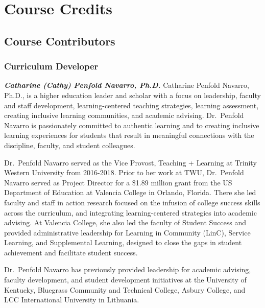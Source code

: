 \documentclass[
]{book}
\begin{document}
\hypertarget{course-credits}{%
\chapter*{Course Credits}\label{course-credits}}

\hypertarget{course-contributors}{%
\section*{Course Contributors}\label{course-contributors}}

\hypertarget{curriculum-developer}{%
\subsection*{Curriculum Developer}\label{curriculum-developer}}

\textbf{\emph{Catharine (Cathy) Penfold Navarro, Ph.D.}}
Catharine Penfold Navarro, Ph.D., is a higher education leader and scholar with a focus on leadership, faculty and staff development, learning-centered teaching strategies, learning assessment, creating inclusive learning communities, and academic advising. Dr.~Penfold Navarro is passionately committed to authentic learning and to creating inclusive learning experiences for students that result in meaningful connections with the discipline, faculty, and student colleagues.

Dr.~Penfold Navarro served as the Vice Provost, Teaching + Learning at Trinity Western University from 2016-2018. Prior to her work at TWU, Dr.~Penfold Navarro served as Project Director for a \$1.89 million grant from the US Department of Education at Valencia College in Orlando, Florida. There she led faculty and staff in action research focused on the infusion of college success skills across the curriculum, and integrating learning-centered strategies into academic advising. At Valencia College, she also led the faculty of Student Success and provided administrative leadership for Learning in Community (LinC), Service Learning, and Supplemental Learning, designed to close the gaps in student achievement and facilitate student success.

Dr.~Penfold Navarro has previously provided leadership for academic advising, faculty development, and student development initiatives at the University of Kentucky, Bluegrass Community and Technical College, Asbury College, and LCC International University in Lithuania.
\end{document}
